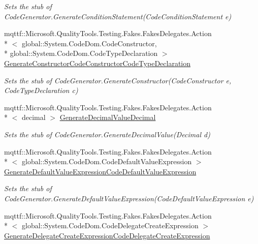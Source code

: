 \begin{DoxyCompactItemize}
\begin{DoxyCompactList}\small\item\em Sets the stub of Code\-Generator.\-Generate\-Condition\-Statement(\-Code\-Condition\-Statement e)\end{DoxyCompactList}\item 
mqttf\-::\-Microsoft.\-Quality\-Tools.\-Testing.\-Fakes.\-Fakes\-Delegates.\-Action\\*
$<$ global\-::\-System.\-Code\-Dom.\-Code\-Constructor, \\*
global\-::\-System.\-Code\-Dom.\-Code\-Type\-Declaration $>$ \hyperlink{class_system_1_1_code_dom_1_1_compiler_1_1_fakes_1_1_stub_code_compiler_a180e56df3363893447f1af43a8f6ef27}{Generate\-Constructor\-Code\-Constructor\-Code\-Type\-Declaration}
\begin{DoxyCompactList}\small\item\em Sets the stub of Code\-Generator.\-Generate\-Constructor(\-Code\-Constructor e, Code\-Type\-Declaration c)\end{DoxyCompactList}\item 
mqttf\-::\-Microsoft.\-Quality\-Tools.\-Testing.\-Fakes.\-Fakes\-Delegates.\-Action\\*
$<$ decimal $>$ \hyperlink{class_system_1_1_code_dom_1_1_compiler_1_1_fakes_1_1_stub_code_compiler_aec8c1edca2c5eb68a465966042f12602}{Generate\-Decimal\-Value\-Decimal}
\begin{DoxyCompactList}\small\item\em Sets the stub of Code\-Generator.\-Generate\-Decimal\-Value(\-Decimal d)\end{DoxyCompactList}\item 
mqttf\-::\-Microsoft.\-Quality\-Tools.\-Testing.\-Fakes.\-Fakes\-Delegates.\-Action\\*
$<$ global\-::\-System.\-Code\-Dom.\-Code\-Default\-Value\-Expression $>$ \hyperlink{class_system_1_1_code_dom_1_1_compiler_1_1_fakes_1_1_stub_code_compiler_ace9cbbc899b552d4098e0e5ca613ca2b}{Generate\-Default\-Value\-Expression\-Code\-Default\-Value\-Expression}
\begin{DoxyCompactList}\small\item\em Sets the stub of Code\-Generator.\-Generate\-Default\-Value\-Expression(\-Code\-Default\-Value\-Expression e)\end{DoxyCompactList}\item 
mqttf\-::\-Microsoft.\-Quality\-Tools.\-Testing.\-Fakes.\-Fakes\-Delegates.\-Action\\*
$<$ global\-::\-System.\-Code\-Dom.\-Code\-Delegate\-Create\-Expression $>$ \hyperlink{class_system_1_1_code_dom_1_1_compiler_1_1_fakes_1_1_stub_code_compiler_aecd4f072fc27aabf582d687bdfb5cc81}{Generate\-Delegate\-Create\-Expression\-Code\-Delegate\-Create\-Expression}

\end{DoxyCompactItemize}
